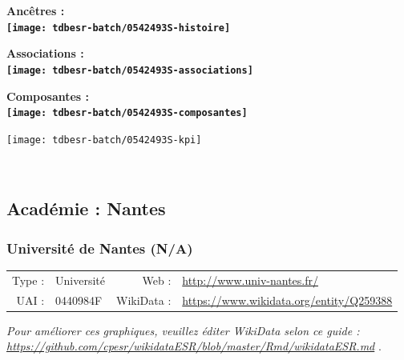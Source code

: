 \documentclass[12pt,french,]{article}
\begin{document}
\vspace{1cm}  
\begin{minipage}[b]{0.50\textwidth}\begin{center} \bf Ancêtres : \\  
\texttt{[image: tdbesr-batch/0542493S-histoire]} \end{center}\end{minipage}\begin{minipage}[b]{0.50\textwidth}\begin{center} \bf Associations : \\  
\texttt{[image: tdbesr-batch/0542493S-associations]} \end{center}\end{minipage}

\hrulefill

\begin{center} \bf Composantes : \\  
\texttt{[image: tdbesr-batch/0542493S-composantes]} \end{center}

\begin{center}\texttt{[image: tdbesr-batch/0542493S-kpi]} \end{center}\checkoddpage

\ifoddpage \fi ~\newpage  

\hypertarget{acaduxe9mie-nantes}{%
\subsection{Académie : Nantes}\label{acaduxe9mie-nantes}}

\hypertarget{universituxe9-de-nantes-na}{%
\subsubsection{Université de Nantes
(N/A)}\label{universituxe9-de-nantes-na}}

\begin{tabular*}{\textwidth}{rp{5cm}rl}  
\hline  
Type : & Université & Web : &\href{http://www.univ-nantes.fr/}{http://www.univ-nantes.fr/} \\  
UAI : & 0440984F & WikiData : & \href{https://www.wikidata.org/entity/Q259388}{https://www.wikidata.org/entity/Q259388} \\  
\hline  
\end{tabular*}

\textit{\scriptsize Pour améliorer ces graphiques, veuillez éditer WikiData selon ce guide :  \href{https://github.com/cpesr/wikidataESR/blob/master/Rmd/wikidataESR.md}{https://github.com/cpesr/wikidataESR/blob/master/Rmd/wikidataESR.md}}
.
\end{document}
